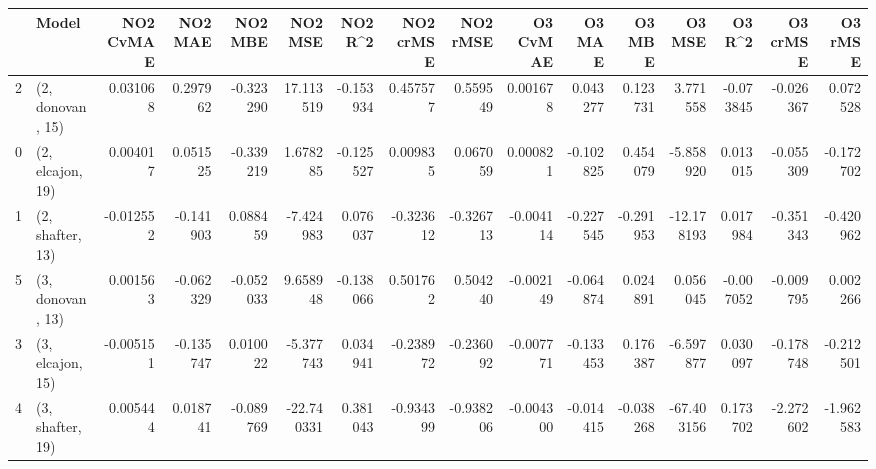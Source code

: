 \begin{tabular}{llrrrrrrrrrrrrrr}
\toprule
{} &             Model &  NO2 CvMAE &   NO2 MAE &   NO2 MBE &    NO2 MSE &   NO2 R\textasciicircum2 &  NO2 crMSE &  NO2 rMSE &  O3 CvMAE &    O3 MAE &    O3 MBE &     O3 MSE &    O3 R\textasciicircum2 &  O3 crMSE &   O3 rMSE \\
\midrule
2 &  (2, donovan, 15) &   0.031068 &  0.297962 & -0.323290 &  17.113519 & -0.153934 &   0.457577 &  0.559549 &  0.001678 &  0.043277 &  0.123731 &   3.771558 & -0.073845 & -0.026367 &  0.072528 \\
0 &  (2, elcajon, 19) &   0.004017 &  0.051525 & -0.339219 &   1.678285 & -0.125527 &   0.009835 &  0.067059 &  0.000821 & -0.102825 &  0.454079 &  -5.858920 &  0.013015 & -0.055309 & -0.172702 \\
1 &  (2, shafter, 13) &  -0.012552 & -0.141903 &  0.088459 &  -7.424983 &  0.076037 &  -0.323612 & -0.326713 & -0.004114 & -0.227545 & -0.291953 & -12.178193 &  0.017984 & -0.351343 & -0.420962 \\
5 &  (3, donovan, 13) &   0.001563 & -0.062329 & -0.052033 &   9.658948 & -0.138066 &   0.501762 &  0.504240 & -0.002149 & -0.064874 &  0.024891 &   0.056045 & -0.007052 & -0.009795 &  0.002266 \\
3 &  (3, elcajon, 15) &  -0.005151 & -0.135747 &  0.010022 &  -5.377743 &  0.034941 &  -0.238972 & -0.236092 & -0.007771 & -0.133453 &  0.176387 &  -6.597877 &  0.030097 & -0.178748 & -0.212501 \\
4 &  (3, shafter, 19) &   0.005444 &  0.018741 & -0.089769 & -22.740331 &  0.381043 &  -0.934399 & -0.938206 & -0.004300 & -0.014415 & -0.038268 & -67.403156 &  0.173702 & -2.272602 & -1.962583 \\
\bottomrule
\end{tabular}
